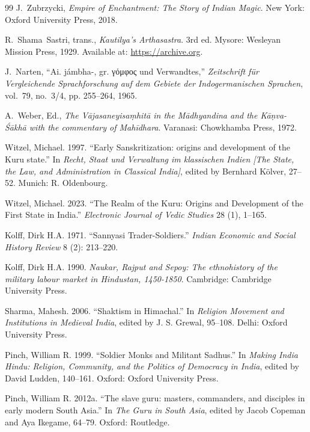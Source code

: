 \documentclass[11pt,twoside,letterpaper]{article}
\begin{document}
\begin{thebibliography}{99}
J.~Zubrzycki, \textit{Empire of Enchantment: The Story of Indian Magic}. New York: Oxford University Press, 2018.

R.~Shama~Sastri, trans., \textit{Kautilya's Arthasastra}. 3rd ed. Mysore: Wesleyan Mission Press, 1929. Available at: \url{https://archive.org}.

J.~Narten, ``Ai. jámbha-, gr. γόμφος und Verwandtes,'' \textit{Zeitschrift für Vergleichende Sprachforschung auf dem Gebiete der Indogermanischen Sprachen}, vol.~79, no.~3/4, pp. 255--264, 1965. 

A.~Weber, Ed., \textit{The Vājasaneyisaṃhitā in the Mādhyandina and the Kāṇva-Śākhā with the commentary of Mahīdhara}. Varanasi: Chowkhamba Press, 1972.

Witzel, Michael. 1997. ``Early Sanskritization: origins and development of the Kuru state.'' In \textit{Recht, Staat und Verwaltung im klassischen Indien [The State, the Law, and Administration in Classical India]}, edited by Bernhard Kölver, 27–52. Munich: R. Oldenbourg.

Witzel, Michael. 2023. ``The Realm of the Kuru: Origins and Development of the First State in India.'' \textit{Electronic Journal of Vedic Studies} 28 (1), 1–165.

Kolff, Dirk H.A. 1971. ``Sannyasi Trader-Soldiers.'' \textit{Indian Economic and Social History Review} 8 (2): 213–220.

Kolff, Dirk H.A. 1990. \textit{Naukar, Rajput and Sepoy: The ethnohistory of the military labour market in Hindustan, 1450-1850}. Cambridge: Cambridge University Press.

Sharma, Mahesh. 2006. ``Shaktism in Himachal.'' In \textit{Religion Movement and Institutions in Medieval India}, edited by J. S. Grewal, 95–108. Delhi: Oxford University Press.

Pinch, William R. 1999. ``Soldier Monks and Militant Sadhus.'' In \textit{Making India Hindu: Religion, Community, and the Politics of Democracy in India}, edited by David Ludden, 140–161. Oxford: Oxford University Press.

Pinch, William R. 2012a. ``The slave guru: masters, commanders, and disciples in early modern South Asia.'' In \textit{The Guru in South Asia}, edited by Jacob Copeman and Aya Ikegame, 64–79. Oxford: Routledge.


\end{thebibliography}
\end{document}
